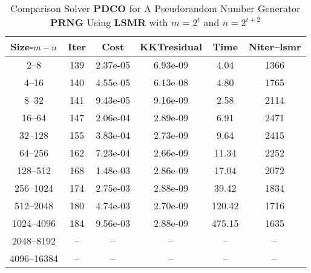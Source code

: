 \begin{table}
\caption{Comparison Solver   {\bf PDCO} for  A Pseudorandom Number Generator {\bf PRNG } Using {\bf LSMR} with  $m=2^{t}$ and $n=2^{t+2}$} 
\begin{center}
\begin{tabular}{|*{6}{c}|} \hline
Size-$m\--n$ & \multicolumn{1}{c}{Iter} & \multicolumn{1}{c}{Cost}& \multicolumn{1}{c}{KKTresidual} & \multicolumn{1}{c}{Time} & \multicolumn{1}{c|}{Niter--lsmr} \\ 
\hline
2--8            &139  & 2.37e-05& 6.93e-09& 4.04 & 1366  \\
4--16           &140  & 4.55e-05& 6.13e-08& 4.80 & 1765  \\
8--32           &141  & 9.43e-05& 9.16e-09& 2.58 & 2114  \\
16--64          &147  & 2.06e-04& 2.89e-09& 6.91 & 2471  \\
32--128         &155  & 3.83e-04& 2.73e-09& 9.64 & 2415  \\
64--256         &162  & 7.23e-04& 2.66e-09& 11.34& 2252  \\
128--512        &168  & 1.48e-03& 2.86e-09& 17.04& 2072  \\
256--1024       &174  & 2.75e-03& 2.88e-09& 39.42& 1834  \\
512--2048       &180  & 4.74e-03& 2.70e-09& 120.42& 1716  \\
1024--4096      &184  & 9.56e-03& 2.88e-09& 475.15& 1635  \\
2048--8192     &--    &--        &--       &--          &--  \\ 
4096--16384    &--    &--        &--        &--         &-- \\
\hline
\end{tabular}
\end{center}
\end{table}
